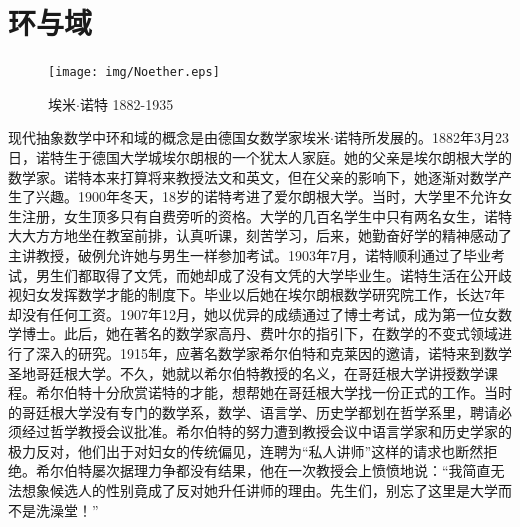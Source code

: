\documentclass{article}
\begin{document}
\begin{Exercise}
\end{Exercise}

\section{环与域}

\begin{figure}
 \centering
 \texttt{[image: img/Noether.eps]}
 \captionsetup{labelformat=empty}
 \caption{埃米$\cdot$诺特 1882-1935}
 \label{fig:Arithmetica}
\end{figure}

现代抽象数学中环和域的概念是由德国女数学家埃米$\cdot$诺特所发展的。1882年3月23日，诺特生于德国大学城埃尔朗根的一个犹太人家庭。她的父亲是埃尔朗根大学的数学家。诺特本来打算将来教授法文和英文，但在父亲的影响下，她逐渐对数学产生了兴趣。1900年冬天，18岁的诺特考进了爱尔朗根大学。当时，大学里不允许女生注册，女生顶多只有自费旁听的资格。大学的几百名学生中只有两名女生，诺特大大方方地坐在教室前排，认真听课，刻苦学习，后来，她勤奋好学的精神感动了主讲教授，破例允许她与男生一样参加考试。1903年7月，诺特顺利通过了毕业考试，男生们都取得了文凭，而她却成了没有文凭的大学毕业生。诺特生活在公开歧视妇女发挥数学才能的制度下。毕业以后她在埃尔朗根数学研究院工作，长达7年却没有任何工资。1907年12月，她以优异的成绩通过了博士考试，成为第一位女数学博士。此后，她在著名的数学家高丹、费叶尔的指引下，在数学的不变式领域进行了深入的研究。1915年，应著名数学家希尔伯特和克莱因的邀请，诺特来到数学圣地哥廷根大学。不久，她就以希尔伯特教授的名义，在哥廷根大学讲授数学课程。希尔伯特十分欣赏诺特的才能，想帮她在哥廷根大学找一份正式的工作。当时的哥廷根大学没有专门的数学系，数学、语言学、历史学都划在哲学系里，聘请必须经过哲学教授会议批准。希尔伯特的努力遭到教授会议中语言学家和历史学家的极力反对，他们出于对妇女的传统偏见，连聘为“私人讲师”这样的请求也断然拒绝。希尔伯特屡次据理力争都没有结果，他在一次教授会上愤愤地说：“我简直无法想象候选人的性别竟成了反对她升任讲师的理由。先生们，别忘了这里是大学而不是洗澡堂！”
\end{document}
